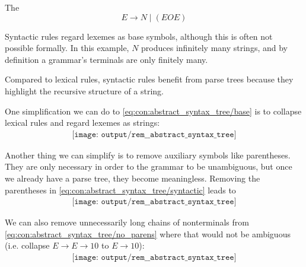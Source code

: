 \begin{concept}
\begin{thmenum}
     The 
    \begin{equation*}
      E \to N \mid (E O E)
    \end{equation*}

    Syntactic rules regard lexemes as base symbols, although this is often not possible formally. In this example, \( N \) produces infinitely many strings, and by definition a grammar's terminals are only finitely many.

    Compared to lexical rules, syntactic rules benefit from parse trees because they highlight the recursive structure of a string.
  \end{thmenum}

  One simplification we can do to \eqref{eq:con:abstract_syntax_tree/base} is to collapse lexical rules and regard lexemes as strings:
  \begin{equation}\label{eq:con:abstract_syntax_tree/syntactic}
    \begin{aligned}
      \texttt{[image: output/rem\_\_abstract\_syntax\_tree]}
    \end{aligned}
  \end{equation}

  Another thing we can simplify is to remove auxiliary symbols like parentheses. They are only necessary in order to the grammar to be unambiguous, but once we already have a parse tree, they become meaningless. Removing the parentheses in \eqref{eq:con:abstract_syntax_tree/syntactic} leads to
  \begin{equation}\label{eq:con:abstract_syntax_tree/no_parens}
    \begin{aligned}
      \texttt{[image: output/rem\_\_abstract\_syntax\_tree]}
    \end{aligned}
  \end{equation}

  We can also remove unnecessarily long chains of nonterminals from \eqref{eq:con:abstract_syntax_tree/no_parens} where that would not be ambiguous (i.e. collapse \( E \to E \to 10 \) to \( E \to 10 \)):
  \begin{equation}\label{eq:con:abstract_syntax_tree/collapsed}
    \begin{aligned}
      \texttt{[image: output/rem\_\_abstract\_syntax\_tree]}
    \end{aligned}
  \end{equation}


\end{concept}
